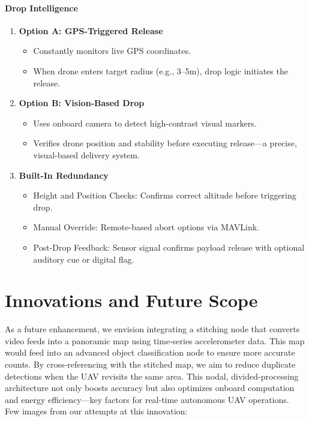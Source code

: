 \documentclass[12pt]{report}
\begin{document}
    \subsubsection{Drop Intelligence}
    \begin{enumerate}
      \item \textbf{Option A: GPS-Triggered Release}
        \begin{itemize}
          \item Constantly monitors live GPS coordinates.
          \item When drone enters target radius (e.g., 3–5m), drop logic initiates the release.
        \end{itemize}
      \item \textbf{Option B: Vision-Based Drop}
        \begin{itemize}
          \item Uses onboard camera to detect  high-contrast visual markers.
          \item Verifies drone position and stability before executing release—a precise, visual-based delivery system.

        \end{itemize}
      \item \textbf{Built-In Redundancy}
        \begin{itemize}
          \item Height and Position Checks: Confirms correct altitude before triggering drop.
          \item Manual Override: Remote-based abort options via MAVLink.
          \item Post-Drop Feedback: Sensor signal confirms payload release with optional auditory cue or digital flag.
        \end{itemize}
    \end{enumerate}


  \chapter{Innovations and Future Scope}
  As a future enhancement, we envision integrating a stitching node that converts video feeds into a panoramic map using time-series accelerometer data. This map would feed into an advanced object classification node to ensure more accurate counts. By cross-referencing with the stitched map, we aim to reduce duplicate detections when the UAV revisits the same area. This nodal, divided-processing architecture not only boosts accuracy but also optimizes onboard computation and energy efficiency—key factors for real-time autonomous UAV operations. \\ Few images from our attempts at this innovation: 
\end{document}
